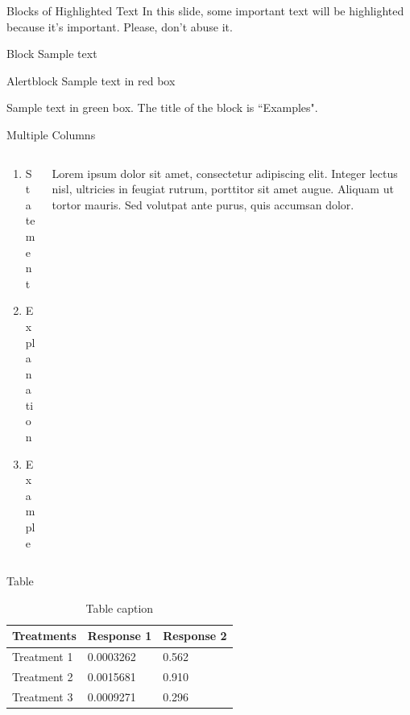 \documentclass[aspectratio=169,xcolor=dvipsnames, t]{beamer}
\begin{document}
\begin{frame}{Blocks of Highlighted Text}
    In this slide, some important text will be \alert{highlighted} because it's important. Please, don't abuse it.

    \begin{block}{Block}
        Sample text
    \end{block}

    \begin{alertblock}{Alertblock}
        Sample text in red box
    \end{alertblock}

    \begin{examples}
        Sample text in green box. The title of the block is ``Examples".
    \end{examples}
\end{frame}

\begin{frame}{Multiple Columns}
    \begin{columns}
    \begin{column}{0.45\textwidth}
        \begin{enumerate}
            \item Statement
            \item Explanation
            \item Example
        \end{enumerate}
    \end{column}
    \begin{column}{0.45\textwidth}  %
        Lorem ipsum dolor sit amet, consectetur adipiscing elit. Integer lectus nisl, ultricies in feugiat rutrum, porttitor sit amet augue. Aliquam ut tortor mauris. Sed volutpat ante purus, quis accumsan dolor.
    \end{column}
    \end{columns}
\end{frame}
\begin{frame}{Table}
    \begin{table}
        \begin{tabular}{l l l}
            \toprule
            \textbf{Treatments} & \textbf{Response 1} & \textbf{Response 2} \\
            \midrule
            Treatment 1         & 0.0003262           & 0.562               \\
            Treatment 2         & 0.0015681           & 0.910               \\
            Treatment 3         & 0.0009271           & 0.296               \\
            \bottomrule
        \end{tabular}
        \caption{Table caption}
    \end{table}
\end{frame}
\end{document}
